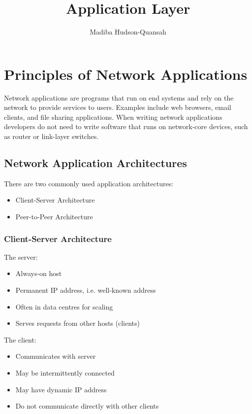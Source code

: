 \documentclass[12pt letter]{report}
\title{\Huge{Application Layer}}
\author{\huge{Madiba Hudson-Quansah}}
\date{}
\begin{document}
\maketitle
\newpage
{}
\tableofcontents
\pagebreak

\chapter{Principles of Network Applications}

Network applications are programs that run on end systems and rely on
the network to provide services to users. Examples include web browsers,
email clients, and file sharing applications. When writing network
applications developers do not need to write software that runs on
network-core devices, such as router or link-layer switches.

\section{Network Application Architectures}


There are two commonly used application architectures:
\begin{itemize}
  \item Client-Server Architecture
  \item Peer-to-Peer Architecture
\end{itemize}

\subsection{Client-Server Architecture}

The server:
\begin{itemize}
  \item Always-on host
  \item Permanent IP address, i.e. well-known address
  \item Often in data centres for scaling
  \item Serves requests from other hosts (clients)
\end{itemize}

The client:
\begin{itemize}
  \item Communicates with server
  \item May be intermittently connected
  \item May have dynamic IP address
  \item Do not communicate directly with other clients
\end{itemize}
\end{document}
